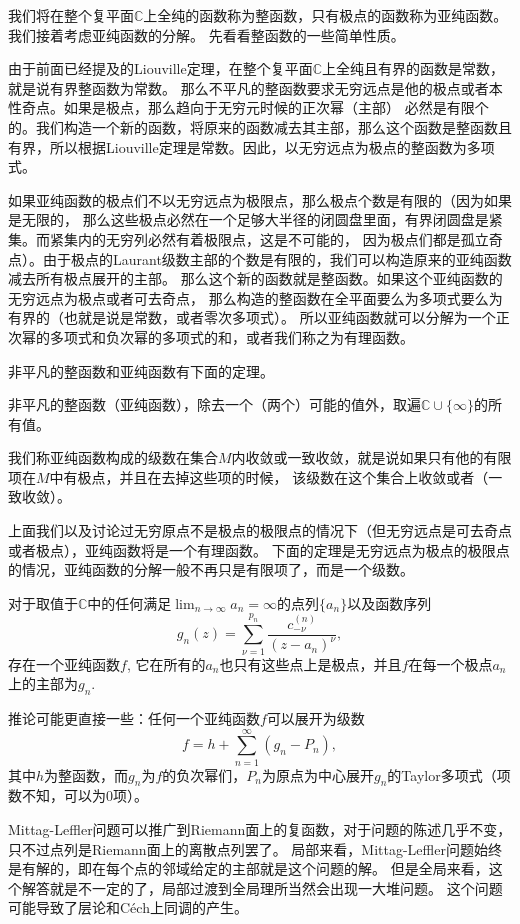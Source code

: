 我们将在整个复平面$\mathbb{C}$上全纯的函数称为整函数，只有极点的函数称为亚纯函数。我们接着考虑亚纯函数的分解。
先看看整函数的一些简单性质。

由于前面已经提及的Liouville定理，在整个复平面$\mathbb{C}$上全纯且有界的函数是常数，就是说有界整函数为常数。
那么不平凡的整函数要求无穷远点是他的极点或者本性奇点。如果是极点，那么趋向于无穷元时候的正次幂（主部）
必然是有限个的。我们构造一个新的函数，将原来的函数减去其主部，那么这个函数是整函数且有界，所以根据Liouville定理是常数。因此，以无穷远点为极点的整函数为多项式。

如果亚纯函数的极点们不以无穷远点为极限点，那么极点个数是有限的（因为如果是无限的，
那么这些极点必然在一个足够大半径的闭圆盘里面，有界闭圆盘是紧集。而紧集内的无穷列必然有着极限点，这是不可能的，
因为极点们都是孤立奇点）。由于极点的Laurant级数主部的个数是有限的，我们可以构造原来的亚纯函数减去所有极点展开的主部。
那么这个新的函数就是整函数。如果这个亚纯函数的无穷远点为极点或者可去奇点，
那么构造的整函数在全平面要么为多项式要么为有界的（也就是说是常数，或者零次多项式）。
所以亚纯函数就可以分解为一个正次幂的多项式和负次幂的多项式的和，或者我们称之为有理函数。

非平凡的整函数和亚纯函数有下面的定理。
\begin{thm}[Picard小定理]
非平凡的整函数（亚纯函数），除去一个（两个）可能的值外，取遍$\mathbb{C}\cup\{\infty\}$的所有值。
\end{thm}
我们称亚纯函数构成的级数在集合$M$内收敛或一致收敛，就是说如果只有他的有限项在$M$中有极点，并且在去掉这些项的时候，
该级数在这个集合上收敛或者（一致收敛）。

上面我们以及讨论过无穷原点不是极点的极限点的情况下（但无穷远点是可去奇点或者极点），亚纯函数将是一个有理函数。
下面的定理是无穷远点为极点的极限点的情况，亚纯函数的分解一般不再只是有限项了，而是一个级数。
\begin{thm}
对于取值于$\mathbb{C}$中的任何满足$\lim_{n \to \infty} a_n = \infty$的点列$\{a_n\}$以及函数序列
\[g_n(z)=\sum_{\nu=1}^{p_n}\frac{c^{(n)}_{-\nu}}{(z-a_n)^\nu},\]存在一个亚纯函数$f$,
它在所有的$a_n$也只有这些点上是极点，并且$f$在每一个极点$a_n$上的主部为$g_n$.
\end{thm}
推论可能更直接一些：任何一个亚纯函数$f$可以展开为级数
\[
f=h+\sum_{n=1}^\infty(g_n-P_n),
\]
其中$h$为整函数，而$g_n$为$f$的负次幂们，$P_n$为原点为中心展开$g_n$的Taylor多项式（项数不知，可以为0项）。

Mittag-Leffler问题可以推广到Riemann面上的复函数，对于问题的陈述几乎不变，只不过点列是Riemann面上的离散点列罢了。
局部来看，Mittag-Leffler问题始终是有解的，即在每个点的邻域给定的主部就是这个问题的解。
但是全局来看，这个解答就是不一定的了，局部过渡到全局理所当然会出现一大堆问题。
这个问题可能导致了层论和C\'ech上同调的产生。

